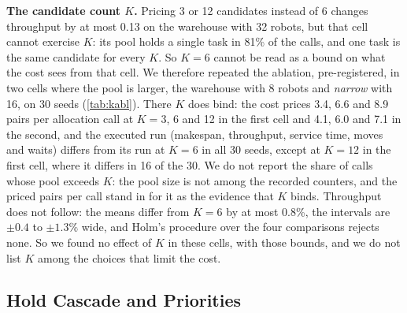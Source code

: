 
\noindent\textbf{The candidate count $K$.}
Pricing 3 or 12 candidates instead of 6 changes throughput by at most 0.13 on
the warehouse with 32 robots, but that cell cannot exercise $K$: its pool holds a
single task in 81\% of the calls, and one task is the same candidate for every $K$.
So $K=6$ cannot be read as a bound on what the cost sees from that cell. We therefore
repeated the ablation, pre-registered, in two cells where the
pool is larger, the warehouse with 8 robots and \emph{narrow} with 16, on 30 seeds
(\cref{tab:kabl}). There $K$ does bind: the cost prices 3.4, 6.6 and 8.9 pairs per
allocation call at $K=3$, 6 and 12 in the first cell and 4.1, 6.0 and 7.1 in the
second, and the executed run (makespan, throughput, service time, moves and waits) differs from its run at $K=6$
in all 30 seeds, except at $K=12$ in the first cell, where it differs in 16 of the 30. We do not report the
share of calls whose pool exceeds $K$: the pool size is not among the recorded counters, and
the priced pairs per call stand in for it as the evidence that $K$ binds. Throughput does
not follow: the means differ from $K=6$ by at most 0.8\%, the intervals are
$\pm0.4$ to $\pm1.3\%$ wide, and Holm's procedure over the four comparisons
rejects none. So we found no effect of $K$ in these cells, with those bounds, and
we do not list $K$ among the choices that limit the cost.

\subsection{Hold Cascade and Priorities}\label{subsec:cascade}


